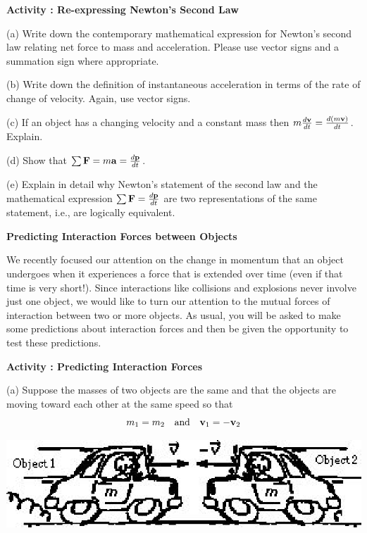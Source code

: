 \textbf{Activity : Re-expressing Newton's Second Law}

(a) Write down the contemporary mathematical expression for Newton's second
law relating net force to mass and acceleration. Please use vector signs and
a summation sign where appropriate.
\vspace{10mm}

(b) Write down the definition of instantaneous acceleration in terms of the
rate of change of velocity. Again, use vector signs.
\vspace{10mm}

(c) If an object has a changing velocity and a constant
mass then \( m\frac{d{\bf v}}{dt}=\frac{d\left( m{\bf v}\right) }{dt} \).
Explain.
\vspace{20mm}

(d) Show that \( \sum {\bf F}=m{\bf a}=\frac{d{\bf p}}{dt} \).
\vspace{20mm}

(e) Explain in detail why Newton's statement of the second law and the mathematical
expression \( \sum {\bf F}=\frac{d{\bf p}}{dt} \) are
two representations of the same statement, i.e., are logically equivalent.
\vspace{20mm}


\textbf{Predicting Interaction Forces between Objects} 

We recently focused our attention on the change in momentum that an object undergoes
when it experiences a force that is extended over time (even if that time is
very short!). Since interactions like collisions and explosions never involve
just one object, we would like to turn our attention to the mutual forces of
interaction between two or more objects. As usual, you will be asked to make
some predictions about interaction forces and then be given the opportunity
to test these predictions. 

\textbf{Activity : Predicting Interaction Forces} 

(a) Suppose the masses of two objects are the same and that the objects are
moving toward each other at the same speed so that
\[
m_{1}=m_{2}\quad \mbox{and}\quad {{\bf v}_{1}}=-{{\bf v}_{2}}\]


\vspace{0.3cm}
{\par\centering \includegraphics{momentum/newtons_laws_fig1.eps} \par}
\vspace{0.3cm}

